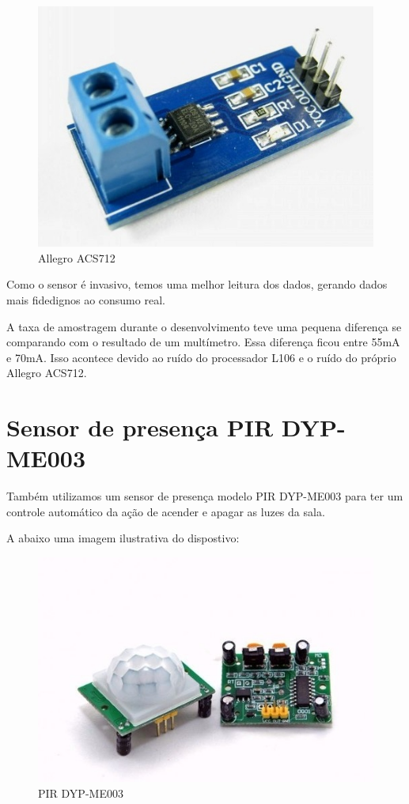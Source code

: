 \documentclass[openright]{normas-utf-tex} %
\begin{document}
\begin{figure}[!htb]
     \centering
     \includegraphics[scale=0.6]{AllegroACS712.jpg}
     \caption{Allegro ACS712}
     \label{fig:AllegreoACS712}
\end{figure}

Como o sensor é invasivo, temos uma melhor leitura dos dados, gerando dados mais fidedignos ao consumo real.

A taxa de amostragem durante o desenvolvimento teve uma pequena diferença se comparando com o resultado de um multímetro. Essa diferença ficou entre 55mA e 70mA. Isso acontece devido ao ruído do processador L106 e o ruído do próprio Allegro ACS712.
 
\section{Sensor de presença PIR DYP-ME003}

Também utilizamos um sensor de presença modelo PIR DYP-ME003   \cite{openimpulse}
para ter um controle automático da ação de acender e apagar as luzes da sala.

A abaixo uma imagem ilustrativa do dispostivo:
\begin{figure}[!htb]
     \centering
     \includegraphics[scale=0.6]{PIR.jpg}
     \caption{PIR DYP-ME003}
     \label{fig:PIR DYP-ME003}
\end{figure}
\end{document}
